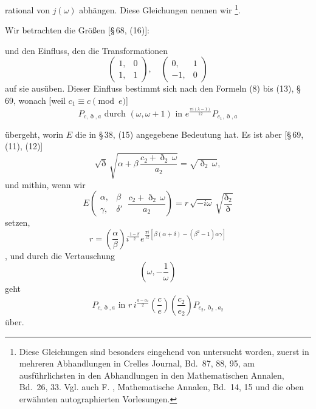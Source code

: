 rational von $j(\omega)$ abhängen. Diese Gleichungen nennen wir
\footnote{Diese Gleichungen sind besonders eingehend von  untersucht worden, zuerst in mehreren Abhandlungen in Crelles Journal, Bd.~87, 88, 95, am ausführlichsten in den Abhandlungen in den Mathematischen Annalen, Bd.~26, 33. Vgl. auch F. , Mathematische Annalen, Bd.~14, 15 und die oben erwähnten autographierten Vorlesungen.}.

Wir betrachten die Größen [§\,68, (16)]:


und den Einfluss, den die Transformationen
\[
\begin{pmatrix} 1, & 0 \\ 1, & 1 \end{pmatrix}, \quad
\begin{pmatrix} 0, & 1 \\ -1, & 0 \end{pmatrix}
\]
auf sie ausüben. Dieser Einfluss bestimmt sich nach den Formeln
(8) bis (13), §\,69, wonach [weil $c_1 \equiv c \pmod{e}$]
\[
P_{c,\eth,a} \text{ durch } (\omega, \omega+1) \text{ in } e^{\frac{\pi i(\lambda-1)}{12}} P_{c_1,\eth,a}
\]


übergeht, worin $E$ die in §\,38, (15) angegebene Bedeutung hat.
Es ist aber [§\,69, (11), (12)]
\[
\sqrt{\eth}\,\sqrt{\alpha+\beta\,\frac{c_2+\eth_2\,\omega}{a_2}} = \sqrt{\eth_2\,\omega},
\]
und mithin, wenn wir
\[
E\!\left(\begin{matrix}\alpha, & \beta \\ \gamma, & \delta' \end{matrix}\ \frac{c_2+\eth_2\,\omega}{a_2}\right) = r\,\sqrt{-i\omega}\,\sqrt{\frac{\eth_2}{\eth}}
\]
setzen,
\[
r = \left(\frac{\alpha}{\beta}\right) i^{\frac{1-\beta}{2}} e^{\frac{\pi i}{12}\left[\beta(\alpha+\delta)-(\beta^2-1)\alpha\gamma\right]}
\]
, und durch die Vertauschung
\[
\left(\omega, -\frac{1}{\omega}\right)
\]
geht
\[
P_{c,\eth,a} \text{ in } r\,i^{\frac{a-a_2}{2}}\left(\frac{c}{e}\right)\left(\frac{c_2}{e_2}\right) P_{c_2,\eth_2,a_2}
\]
über.
